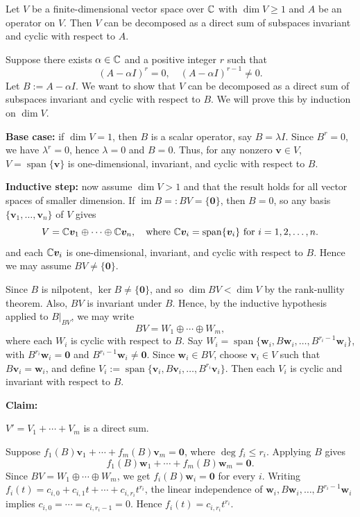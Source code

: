 \begin{theoremenv}
    Let $V$ be a finite-dimensional vector space over $\mathbb{C}$ with $\dim V \ge 1$ and $A$ be an operator on $V$. Then $V$ can be decomposed as a direct sum of subspaces invariant and cyclic with respect to $A$.
\end{theoremenv}
\begin{proofenv}
    Suppose there exists $\alpha \in \mathbb{C}$ and a positive integer $r$ such that
    $$ (A - \alpha I)^r = 0, \quad (A - \alpha I)^{r-1} \ne 0. $$
    Let $B := A - \alpha I$. We want to show that $V$ can be decomposed as a direct sum of subspaces invariant and cyclic with respect to $B$. We will prove this by induction on $\dim V$.

    \textbf{Base case:} if $\dim V=1$, then $B$ is a scalar operator, say $B=\lambda I$. Since $B^r=0$, we have $\lambda^r=0$, hence $\lambda=0$ and $B=0$. Thus, for any nonzero $\bm v\in V$, $V=\operatorname{span}\{\bm v\}$ is one-dimensional, invariant, and cyclic with respect to $B$.

    \textbf{Inductive step:} now assume $\dim V>1$ and that the result holds for all vector spaces of smaller dimension. If $\operatorname{im}B =: BV=\{\bm 0\}$, then $B=0$, so any basis $\{\bm v_1,\dots,\bm v_n\}$ of $V$ gives
    $$
    V=\mathbb{C}\bm v_1\oplus\cdots\oplus\mathbb{C}\bm v_n, \quad \text{where } \mathbb{C}\bm v_i = \operatorname{span}\{\bm v_i\} \text{ for } i=1,2,\ldots,n.
    $$
    and each $\mathbb{C}\bm v_i$ is one-dimensional, invariant, and cyclic with respect to $B$. Hence we may assume $BV\ne\{\bm 0\}$.

    Since $B$ is nilpotent, $\ker B\ne\{\bm 0\}$, and so $\dim BV<\dim V$ by the rank-nullity theorem. Also, $BV$ is invariant under $B$. Hence, by the inductive hypothesis applied to $B|_{BV}$, we may write
    $$
    BV=W_1\oplus\cdots\oplus W_m,
    $$
    where each $W_i$ is cyclic with respect to $B$. Say $W_i=\operatorname{span}\{\bm w_i,B\bm w_i,\dots,B^{r_i-1}\bm w_i\}$, with $B^{r_i}\bm w_i=\bm 0$ and $B^{r_i-1}\bm w_i\ne\bm 0$. Since $\bm w_i\in BV$, choose $\bm v_i\in V$ such that $B\bm v_i=\bm w_i$, and define $V_i:=\operatorname{span}\{\bm v_i,B\bm v_i,\dots,B^{r_i}\bm v_i\}$. Then each $V_i$ is cyclic and invariant with respect to $B$.

    \textbf{Claim:}
    
    \begin{center}
        $V'=V_1+\cdots+V_m$ is a direct sum.
    \end{center}

    Suppose $f_1(B)\bm v_1+\cdots+f_m(B)\bm v_m=\bm 0$, where $\deg f_i\le r_i$. Applying $B$ gives $$f_1(B)\bm w_1+\cdots+f_m(B)\bm w_m=\bm 0.$$
    Since $BV=W_1\oplus\cdots\oplus W_m$, we get $f_i(B)\bm w_i=\bm 0$ for every $i$. Writing $f_i(t)=c_{i,0}+c_{i,1}t+\cdots+c_{i,r_i}t^{r_i}$, the linear independence of $\bm w_i,B\bm w_i,\dots,B^{r_i-1}\bm w_i$ implies $c_{i,0}=\cdots=c_{i,r_i-1}=0$. Hence $f_i(t)=c_{i,r_i}t^{r_i}$.


\end{proofenv}
